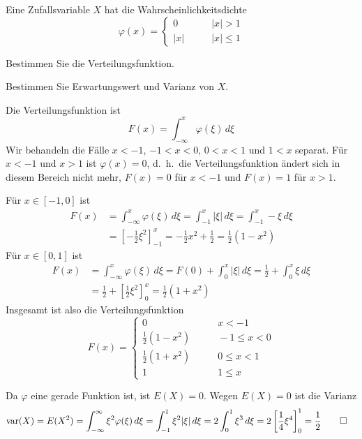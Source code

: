 Eine Zufallsvariable $X$ hat die Wahrscheinlichkeitsdichte
\[
\varphi(x)=\begin{cases}
0&\qquad |x|>1\\
|x|&\qquad |x|\le 1
\end{cases}
\]
\begin{teilaufgaben}
\item Bestimmen Sie die Verteilungsfunktion.
\item Bestimmen Sie Erwartungswert und Varianz von $X$.
\end{teilaufgaben}


\begin{loesung}
\begin{teilaufgaben}
\item Die Verteilungsfunktion ist
\[
F(x)=\int_{-\infty}^x\varphi(\xi)\,d\xi
\]
Wir behandeln die Fälle $x<-1$, $-1<x<0$, $0<x<1$ und $1<x$
separat. Für $x<-1$ und $x>1$ ist $\varphi(x)=0$, d.~h.~die
Verteilungsfunktion ändert sich in diesem Bereich nicht mehr,
$F(x)=0$ für $x<-1$ und $F(x)=1$ für $x>1$.

Für $x\in[-1,0]$ ist
\begin{align*}
F(x)&=\int_{-\infty}^x\varphi(\xi) \,d\xi
=
\int_{-1}^x|\xi|\,d\xi
=
\int_{-1}^x-\xi\,d\xi
\\
&=\left[-\frac12\xi^2\right]_{-1}^x
=-\frac12x^2+\frac12=\frac12(1-x^2)
\end{align*}
Für $x\in[0,1]$ ist
\begin{align*}
F(x)
&=
\int_{-\infty}^x \varphi(\xi)\,d\xi
=
F(0)+\int_0^x|\xi|\,d\xi
=
\frac12+\int_0^x\xi\,d\xi
\\
&=
\frac12+\left[
\frac12\xi^2
\right]_0^x
=\frac12(1+x^2)
\end{align*}
Insgesamt ist also die Verteilungsfunktion
\[
F(x)
=
\begin{cases}
0&\qquad x<-1\\
\frac12(1-x^2)&\qquad -1\le x < 0\\
\frac12(1+x^2)&\qquad 0\le x <1\\
1&\qquad 1 \le x
\end{cases}
\]
\item
Da $\varphi$ eine gerade Funktion ist, ist $E(X)=0$.
Wegen $E(X)=0$ ist die Varianz
\begin{align*}
\operatorname{var}(X)&=E(X^2)
=
\int_{-\infty}^\infty \xi^2\varphi(\xi)\,d\xi
=
\int_{-1}^1\xi^2|\xi|\,d\xi
=2\int_0^1\xi^3\,d\xi=2\left[\frac14\xi^4\right]_0^1=\frac12
\qedhere
\end{align*}
\end{teilaufgaben}
\end{loesung}

